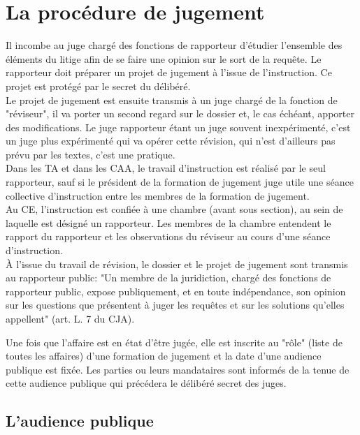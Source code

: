 \documentclass[10pt, a4paper, openany]{book}
\begin{document}
\section{La procédure de jugement}

Il incombe au juge chargé des fonctions de rapporteur d'étudier l'ensemble des éléments du litige afin de se faire une opinion sur le sort de la requête. Le rapporteur doit préparer un projet de jugement à l'issue de l'instruction. Ce projet est protégé par le secret du délibéré. \\
Le projet de jugement est ensuite transmis à un juge chargé de la fonction de "réviseur", il va porter un second regard sur le dossier et, le cas échéant, apporter des modifications. Le juge rapporteur étant un juge souvent inexpérimenté, c'est un juge plus expérimenté qui va opérer cette révision, qui n'est d'ailleurs pas prévu par les textes, c'est une pratique. \\
Dans les TA et dans les CAA, le travail d'instruction est réalisé par le seul rapporteur, sauf si le président de la formation de jugement juge utile une séance collective d'instruction entre les membres de la formation de jugement. \\
Au CE, l'instruction est confiée à une chambre (avant sous section), au sein de laquelle est désigné un rapporteur. Les membres de la chambre entendent le rapport du rapporteur et les observations du réviseur au cours d'une séance d'instruction. \\
À l'issue du travail de révision, le dossier et le projet de jugement sont transmis au rapporteur public: "Un membre de la juridiction, chargé des fonctions de rapporteur public, expose publiquement, et en toute indépendance, son opinion sur les questions que présentent à juger les requêtes et sur les solutions qu'elles appellent" (art. L. 7 du CJA). 


Une fois que l'affaire est en état d'être jugée, elle est inscrite au "rôle" (liste de toutes les affaires) d'une formation de jugement et la date d'une audience publique est fixée. Les parties ou leurs mandataires sont informés de la tenue de cette audience publique qui précédera le délibéré secret des juges. 

\subsection{L'audience publique}
\end{document}
